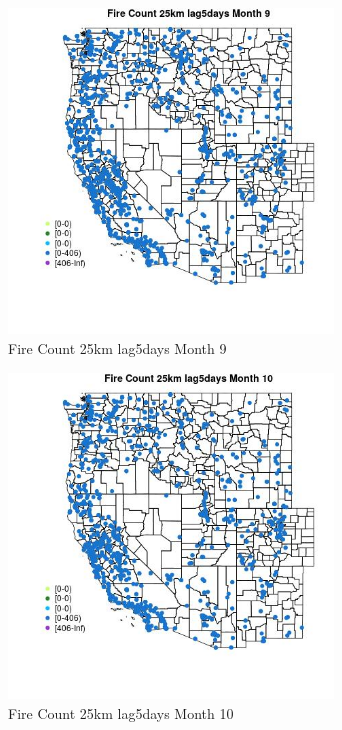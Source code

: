 \begin{figure} 
\centering  
\includegraphics[width=0.77\textwidth]{Code_Outputs/Report_ML_input_PM25_Step4_part_f_de_duplicated_aveswNAs_MapObsMo9Fire_Count_25km_lag5days.jpg} 
\caption{\label{fig:Report_ML_input_PM25_Step4_part_f_de_duplicated_aveswNAsMapObsMo9Fire_Count_25km_lag5days}Fire Count 25km lag5days Month 9} 
\end{figure} 
 

\begin{figure} 
\centering  
\includegraphics[width=0.77\textwidth]{Code_Outputs/Report_ML_input_PM25_Step4_part_f_de_duplicated_aveswNAs_MapObsMo10Fire_Count_25km_lag5days.jpg} 
\caption{\label{fig:Report_ML_input_PM25_Step4_part_f_de_duplicated_aveswNAsMapObsMo10Fire_Count_25km_lag5days}Fire Count 25km lag5days Month 10} 
\end{figure} 
 

